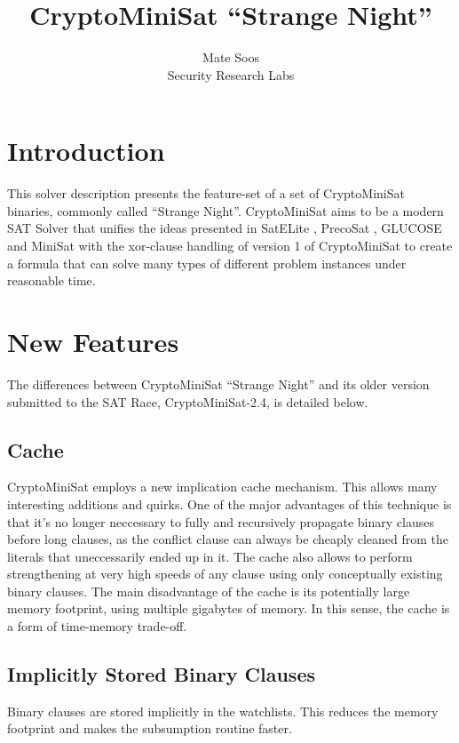 \documentclass[final]{ieee}
\begin{document}
\title{CryptoMiniSat ``Strange Night''}
\author{Mate Soos\\Security Research Labs}

\maketitle
\thispagestyle{empty}
\pagestyle{empty}

\section{Introduction}
This solver description presents the feature-set of a set of CryptoMiniSat binaries, commonly called ``Strange Night''. CryptoMiniSat aims to be a modern SAT Solver that unifies the ideas presented in SatELite \cite{DBLP:conf/sat/EenB05}, PrecoSat \cite{precosat}, GLUCOSE \cite{glucose} and MiniSat \cite{EenS03MiniSat} with the xor-clause handling of version 1 of CryptoMiniSat \cite{DBLP:conf/sat/SoosNC09} to create a formula that can solve many types of different problem instances under reasonable time.

\section{New Features}
The differences between CryptoMiniSat ``Strange Night'' and its older version submitted to the SAT Race, CryptoMiniSat-2.4, is detailed below.

\subsection{Cache}
CryptoMiniSat employs a new implication cache mechanism. This allows many interesting additions and quirks. One of the major advantages of this technique is that it's no longer neccessary to fully and recursively propagate binary clauses before long clauses, as the conflict clause can always be cheaply cleaned from the literals that uneccessarily ended up in it. The cache also allows to perform strengthening at very high speeds of any clause using only conceptually existing binary clauses.
The main disadvantage of the cache is its potentially large memory footprint, using multiple gigabytes of memory. In this sense, the cache is a form of time-memory trade-off.

\subsection{Implicitly Stored Binary Clauses}
Binary clauses are stored implicitly in the watchlists. This reduces the memory footprint and makes the subsumption routine faster. %
\end{document}
